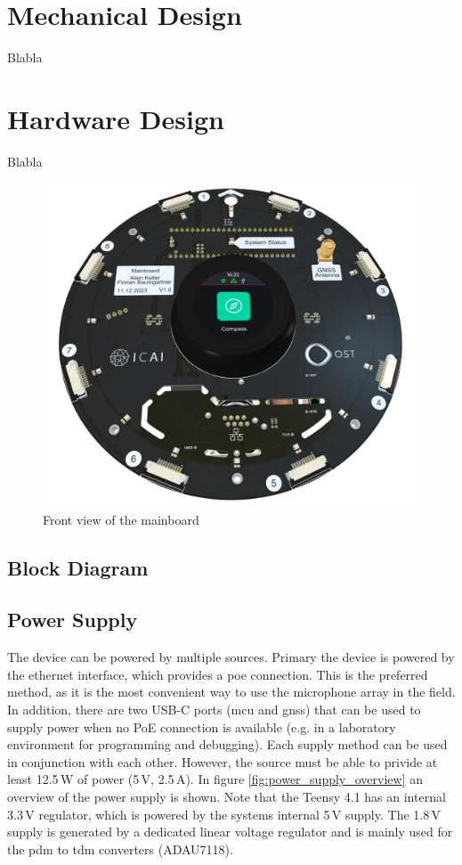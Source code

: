 \newpage
\section{Mechanical Design}
Blabla




\newpage
\section{Hardware Design}
Blabla

\begin{figure}
	\centering
	\includegraphics[width=1.0\textwidth]{images/6_design_final/Mainboard_Front_Display.png}
	\caption{Front view of the mainboard}
	\label{fig:mainboard_front}
\end{figure}




\subsection{Block Diagram}

\subsection{Power Supply}
The device can be powered by multiple sources. Primary the device is powered by the ethernet interface, which provides a \acrfull{poe} connection.
This is the preferred method, as it is the most convenient way to use the microphone array in the field.
In addition, there are two USB-C ports (\acrshort{mcu} and \acrshort{gnss}) that can be used to supply power when no PoE connection is available (e.g. in a laboratory environment for programming and debugging).
Each supply method can be used in conjunction with each other. However, the source must be able to privide at least 12.5\,W of power (5\,V, 2.5\,A).
In figure \ref{fig:power_supply_overview} an overview of the power supply is shown.
Note that the Teensy 4.1 has an internal 3.3\,V regulator, which is powered by the systems internal 5\,V supply.
The 1.8\,V supply is generated by a dedicated linear voltage regulator and is mainly used for the \acrshort{pdm} to \acrshort{tdm} converters (ADAU7118).

